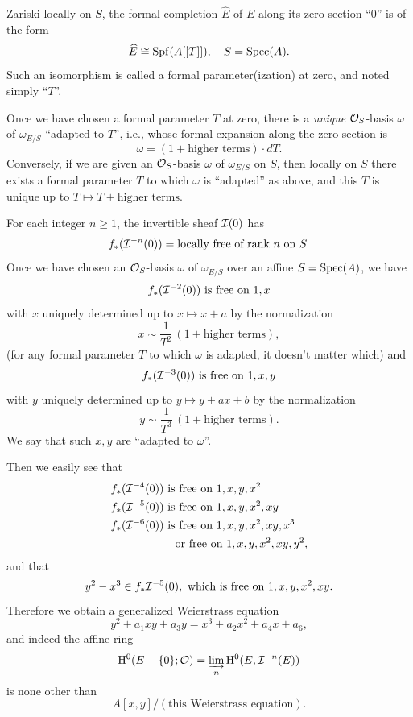 \kmitem\label{item:2.2.3}
Zariski locally on $S$, the formal completion $\widehat{E}$ of $E$ along its zero-section ``$0$'' is of the form
\[
\widehat{E} \cong \operatorname{Spf}(A[[T]]), \quad S = \operatorname{Spec}(A).
\]
Such an isomorphism is called a formal parameter(ization) at zero, and noted simply ``$T$''.

\kmitem\label{item:2.2.4}
Once we have chosen a formal parameter $T$ at zero, there is a \emph{unique} $\mathcal{O}_S$-basis $\omega$ of $\omega_{E/S}$ ``adapted to $T$'', i.e., whose formal expansion along the zero-section is
\[
\omega = (1 + \text{higher terms}) \cdot dT.
\]
Conversely, if we are given an $\mathcal{O}_S$-basis $\omega$ of $\omega_{E/S}$ on $S$, then locally on $S$ there exists a formal parameter $T$ to which $\omega$ is ``adapted'' as above, and this $T$ is unique up to $T \mapsto T + \text{higher terms}$.

\kmitem\label{item:2.2.5}
For each integer $n \ge 1$, the invertible sheaf $\mathcal{I}(0)$ has
\[
f_*(\mathcal{I}^{-n}(0)) = \text{locally free of rank } n \text{ on } S.
\]
Once we have chosen an $\mathcal{O}_S$-basis $\omega$ of $\omega_{E/S}$ over an affine $S = \operatorname{Spec}(A)$, we have
\[
f_*(\mathcal{I}^{-2}(0)) \text{ is free on } 1, x
\]
with $x$ uniquely determined up to $x \mapsto x + a$ by the normalization
\[
x \sim \frac{1}{T^2}\,(1 + \text{higher terms}),
\]
(for any formal parameter $T$ to which $\omega$ is adapted, it doesn't matter which) and
\[
f_*(\mathcal{I}^{-3}(0)) \text{ is free on } 1, x, y
\]
with $y$ uniquely determined up to $y \mapsto y + ax + b$ by the normalization
\[
y \sim \frac{1}{T^3}\,(1 + \text{higher terms}).
\]
We say that such $x, y$ are ``adapted to $\omega$''.

\noindent Then we easily see that
\begin{align*}
f_*(\mathcal{I}^{-4}(0)) &\text{ is free on } 1, x, y, x^2 \\
f_*(\mathcal{I}^{-5}(0)) &\text{ is free on } 1, x, y, x^2, xy \\
f_*(\mathcal{I}^{-6}(0)) &\text{ is free on } 1, x, y, x^2, xy, x^3 \\
&\quad \text{or free on } 1, x, y, x^2, xy, y^2,
\end{align*}
and that
\[
y^2 - x^3 \in f_* \mathcal{I}^{-5}(0), \text{ which is free on } 1, x, y, x^2, xy.
\]
Therefore we obtain a generalized Weierstrass equation
\begin{equation}\label{eq:2.2.5.1}
y^2 + a_1 xy + a_3 y = x^3 + a_2 x^2 + a_4 x + a_6,
\end{equation}
and indeed the affine ring
\[
\mathrm{H}^0(E - \{0\}; \mathcal{O}) = \varinjlim_{n} \mathrm{H}^0(E, \mathcal{I}^{-n}(E))
\]
is none other than
\[
A[x, y]/(\text{this Weierstrass equation}).
\]

